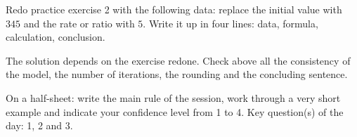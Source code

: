 
    \begin{homework}Redo practice exercise 2 with the following data: replace the initial value with $345$ and the rate or ratio with $5$. Write it up in four lines: data, formula, calculation, conclusion.\end{homework}
    \begin{solution}The solution depends on the exercise redone. Check above all the consistency of the model, the number of iterations, the rounding and the concluding sentence.\end{solution}

    \begin{exitticket}[3 minutes]On a half-sheet: write the main rule of the session, work through a very short example and indicate your confidence level from 1 to 4. Key question(s) of the day: 1, 2 and 3.\end{exitticket}

